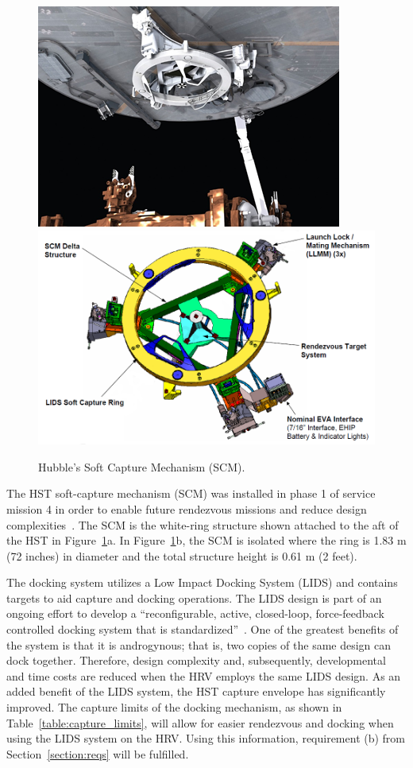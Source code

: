 \documentclass[paper=letter, fontsize=11pt]{scrartcl} %
\numberwithin{equation}{section} %
\numberwithin{figure}{section} %
\numberwithin{table}{section} %
\begin{document}
\begin{figure}[H]
    \begin{center}
        \includegraphics[width=.65\textwidth]{HST_Interface_Figures/H1A.png}
        \includegraphics[width=.65\textwidth]{HST_Interface_Figures/H1B.png}
        \caption{Hubble's Soft Capture Mechanism (SCM).}
        \label{H1}
    \end{center}
\end{figure}
The HST soft-capture mechanism (SCM) was installed in phase 1 of service mission 4 in order to enable future rendezvous missions and reduce design complexities~\cite{ref1}. The SCM is the white-ring structure shown attached to the aft of the HST in Figure~\ref{H1}a. In Figure~\ref{H1}b, the SCM is isolated where the ring is 1.83 m (72 inches) in diameter and the total structure height is 0.61 m (2 feet).

The docking system utilizes a Low Impact Docking System (LIDS) and contains targets to aid capture and docking operations. The LIDS design is part of an ongoing effort to develop a ``reconfigurable, active, closed-loop, force-feedback controlled docking system that is standardized''~\cite{ref3}. One of the greatest benefits of the system is that it is androgynous; that is, two copies of the same design can dock together. Therefore, design complexity and, subsequently, developmental and time costs are reduced when the HRV employs the same LIDS design. As an added benefit of the LIDS system, the HST capture envelope has significantly improved. The capture limits of the docking mechanism, as shown in Table~\ref{table:capture_limits}, will allow for easier rendezvous and docking when using the LIDS system on the HRV. Using this information, requirement (b) from Section~\ref{section:reqs} will be fulfilled.
\end{document}
